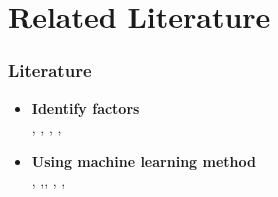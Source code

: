 \documentclass[12pt]{beamer}
\begin{document}
	\section{Related Literature}
	\begin{frame}
\frametitle{Literature}
\begin{itemize}
	\item {\bf Identify factors}\\
	, , , ,
	\item {\bf Using machine learning method}\\
	, ,, , , 
	\end{itemize}
	\end{frame}
	
	
	
	
	

\end{document}

